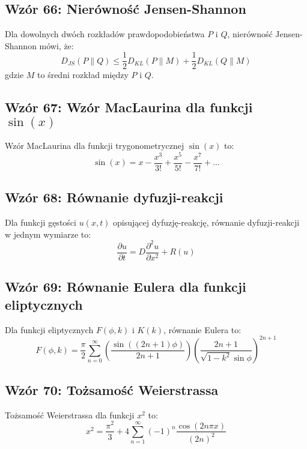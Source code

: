 \documentclass{article}
\begin{document}
\subsection*{Wzór 66: Nierówność Jensen-Shannon}

Dla dowolnych dwóch rozkładów prawdopodobieństwa \(P\) i \(Q\), nierówność Jensen-Shannon mówi, że:
\[ D_{JS}(P\|Q) \leq \frac{1}{2}D_{KL}(P\|M) + \frac{1}{2}D_{KL}(Q\|M) \]
gdzie \(M\) to średni rozkład między \(P\) i \(Q\).

\subsection*{Wzór 67: Wzór MacLaurina dla funkcji \(\sin(x)\)}

Wzór MacLaurina dla funkcji trygonometrycznej \(\sin(x)\) to:
\[ \sin(x) = x - \frac{x^3}{3!} + \frac{x^5}{5!} - \frac{x^7}{7!} + \ldots \]

\subsection*{Wzór 68: Równanie dyfuzji-reakcji}

Dla funkcji gęstości \(u(x, t)\) opisującej dyfuzję-reakcję, równanie dyfuzji-reakcji w jednym wymiarze to:
\[ \frac{\partial u}{\partial t} = D \frac{\partial^2 u}{\partial x^2} + R(u) \]

\subsection*{Wzór 69: Równanie Eulera dla funkcji eliptycznych}

Dla funkcji eliptycznych \(F(\phi, k)\) i \(K(k)\), równanie Eulera to:
\[ F(\phi, k) = \frac{\pi}{2} \sum_{n=0}^{\infty} \left(\frac{\sin((2n+1)\phi)}{2n+1}\right) \left(\frac{2n+1}{\sqrt{1-k^2}\sin\phi}\right)^{2n+1} \]

\subsection*{Wzór 70: Tożsamość Weierstrassa}

Tożsamość Weierstrassa dla funkcji \(x^2\) to:
\[ x^2 = \frac{\pi^2}{3} + 4\sum_{n=1}^{\infty} (-1)^n \frac{\cos(2n\pi x)}{(2n)^2} \]
\end{document}
